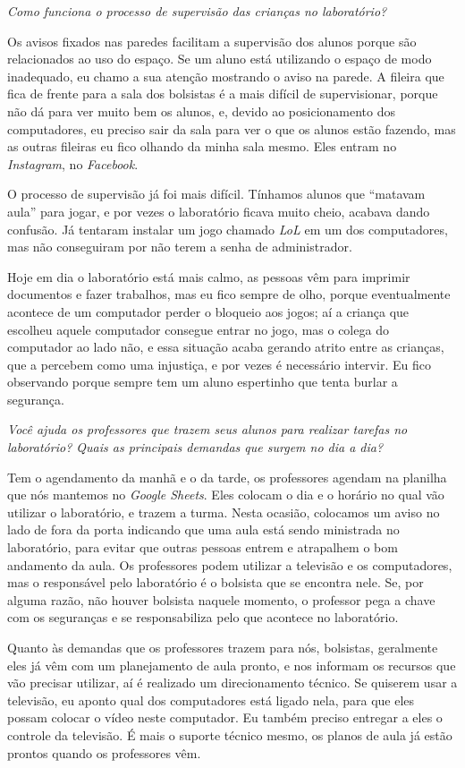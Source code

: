 \textit{Como funciona o processo de supervisão das crianças no laboratório?}

Os avisos fixados nas paredes facilitam a supervisão dos alunos porque são relacionados ao uso do espaço. Se um aluno está utilizando o espaço de modo inadequado, eu chamo a sua atenção mostrando o aviso na parede. A fileira que fica de frente para a sala dos bolsistas é a mais difícil de supervisionar, porque não dá para ver muito bem os alunos, e, devido ao posicionamento dos computadores, eu preciso sair da sala para ver o que os alunos estão fazendo, mas as outras fileiras eu fico olhando da minha sala mesmo. Eles entram no \textit{Instagram}, no \textit{Facebook}.

O processo de supervisão já foi mais difícil. Tínhamos alunos que “matavam aula” para jogar, e por vezes o laboratório ficava muito cheio, acabava dando confusão. Já tentaram instalar um jogo chamado \textit{LoL} em um dos computadores, mas não conseguiram por não terem a senha de administrador.

Hoje em dia o laboratório está mais calmo, as pessoas vêm para imprimir documentos e fazer trabalhos, mas eu fico sempre de olho, porque eventualmente acontece de um computador perder o bloqueio aos jogos; aí a criança que escolheu aquele computador consegue entrar no jogo, mas o colega do computador ao lado não, e essa situação acaba gerando atrito entre as crianças, que a percebem como uma injustiça, e por vezes é necessário intervir. Eu fico observando porque sempre tem um aluno espertinho que tenta burlar a segurança.

\textit{Você ajuda os professores que trazem seus alunos para realizar tarefas no laboratório? Quais as principais demandas que surgem no dia a dia?}

Tem o agendamento da manhã e o da tarde, os professores agendam na planilha que nós mantemos no \textit{Google Sheets}. Eles colocam o dia e o horário no qual vão utilizar o laboratório, e trazem a turma. Nesta ocasião, colocamos um aviso no lado de fora da porta indicando que uma aula está sendo ministrada no laboratório, para evitar que outras pessoas entrem e atrapalhem o bom andamento da aula. Os professores podem utilizar a televisão e os computadores, mas o responsável pelo laboratório é o bolsista que se encontra nele. Se, por alguma razão, não houver bolsista naquele momento, o professor pega a chave com os seguranças e se responsabiliza pelo que acontece no laboratório.

Quanto às demandas que os professores trazem para nós, bolsistas, geralmente eles já vêm com um planejamento de aula pronto, e nos informam os recursos que vão precisar utilizar, aí é realizado um direcionamento técnico. Se quiserem usar a televisão, eu aponto qual dos computadores está ligado nela, para que eles possam colocar o vídeo neste computador. Eu também preciso entregar a eles o controle da televisão. É mais o suporte técnico mesmo, os planos de aula já estão prontos quando os professores vêm.

